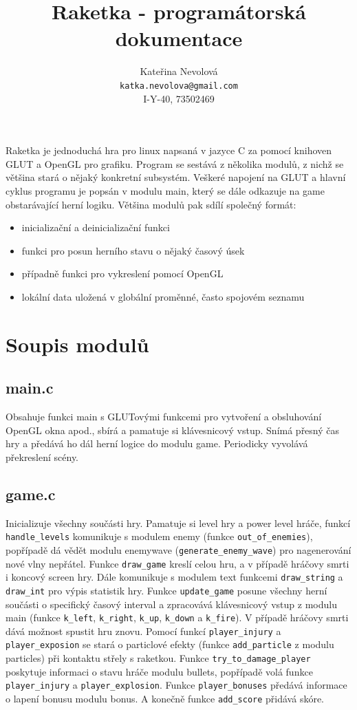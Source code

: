 \documentclass{article}
\title{Raketka - programátorská dokumentace}
\author{Kateřina Nevolová \\ \texttt{katka.nevolova@gmail.com} \\ I-Y-40, 73502469}
\begin{document}
\maketitle

Raketka je jednoduchá hra pro linux napsaná v jazyce C za pomocí knihoven GLUT
a OpenGL pro grafiku. Program se sestává z několika modulů, z nichž se většina stará o nějaký konkretní subsystém. Veškeré napojení na GLUT a hlavní cyklus programu je popsán v modulu main, který se dále odkazuje na game obstarávající herní
logiku. Většina modulů pak sdílí společný formát:

\begin{itemize}
\item inicializační a deinicializační funkci
\item funkci pro posun herního stavu o nějaký časový úsek
\item případně funkci pro vykreslení pomocí OpenGL
\item lokální data uložená v globální proměnné, často spojovém seznamu
\end{itemize}

\section{Soupis modulů}

\subsection{main.c}
Obsahuje funkci main s GLUTovými funkcemi pro vytvoření a obsluhování
OpenGL okna apod., sbírá a pamatuje si klávesnicový vstup. Snímá
přesný čas hry a předává ho dál herní logice do modulu game.
Periodicky vyvolává překreslení scény.

\subsection{game.c}
Inicializuje všechny součásti hry. Pamatuje si level hry a power
level hráče, funkcí \texttt{handle\_levels} komunikuje s modulem enemy (funkce
\texttt{out\_of\_enemies}), popřípadě dá vědět modulu enemywave
(\texttt{generate\_enemy\_wave}) pro nagenerování nové vlny nepřátel. Funkce
\texttt{draw\_game} kreslí celou hru, a v případě hráčovy smrti i koncový
screen hry. Dále komunikuje s modulem text funkcemi \texttt{draw\_string} a
\texttt{draw\_int} pro výpis statistik hry. Funkce \texttt{update\_game} posune
všechny herní součásti o specifický časový interval a zpracovává
klávesnicový vstup z modulu main (funkce \texttt{k\_left}, \texttt{k\_right}, \texttt{k\_up},
\texttt{k\_down} a \texttt{k\_fire}). V případě hráčovy smrti dává možnost spustit hru
znovu. Pomocí funkcí \texttt{player\_injury} a \texttt{player\_exposion} se stará
o particlové efekty (funkce \texttt{add\_particle} z modulu particles) při
kontaktu střely s raketkou. Funkce \texttt{try\_to\_damage\_player} poskytuje
informaci o stavu hráče modulu bullets, popřípadě volá funkce
\texttt{player\_injury} a \texttt{player\_explosion}. Funkce \texttt{player\_bonuses} předává
informace o lapení bonusu modulu bonus. A konečně funkce \texttt{add\_score}
přidává skóre.
\end{document}
